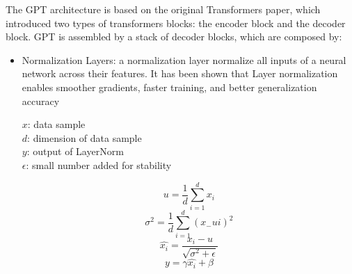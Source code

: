 The GPT architecture is based on the original Transformers paper, which introduced two types of transformers blocks: the encoder block and the decoder block. GPT is assembled by a stack of decoder blocks, which are composed by:
\begin{itemize}
    \item Normalization Layers: a normalization layer \cite{ba2016layer}  normalize all inputs of a neural network across their features. It has been shown that Layer normalization enables smoother gradients, faster training, and better generalization accuracy \cite{xu2019understanding}

    $x$: data sample \\
    $d$: dimension of data sample \\
    $y$: output of LayerNorm \\
    $\epsilon$: small number added for stability

    \begin{equation*}
        u = \frac{1}{d}\sum_{i=1}^{d}x_i 
    \end{equation*}
    \begin{equation*}
        \sigma^2 = \frac{1}{d}\sum_{i=1}^{d}(x_ - ui)^2
    \end{equation*}
    \begin{equation*}
        \hat{x_i} = \frac{x_i - u}{\sqrt{\sigma^2 + \epsilon}}
    \end{equation*}
    \begin{equation*}
        y = \gamma\hat{x_i} + \beta
    \end{equation*}


\end{itemize}
